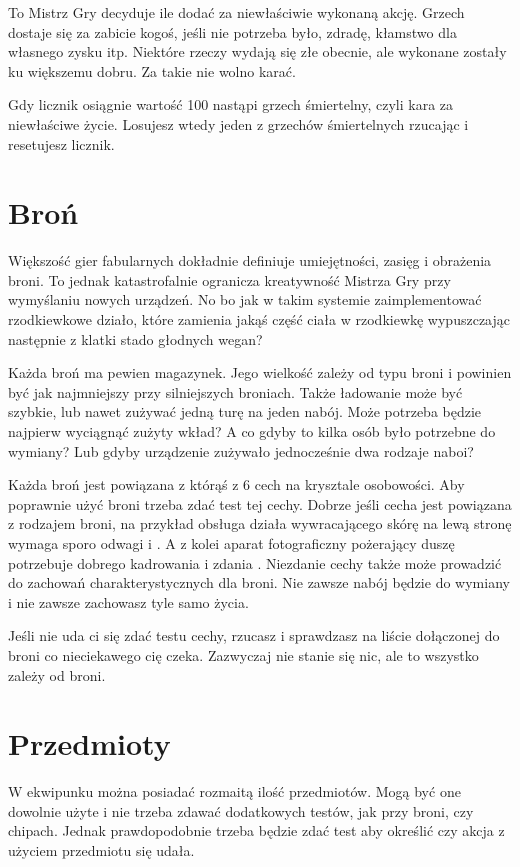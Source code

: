 To Mistrz Gry decyduje ile \abgrz{} dodać za niewłaściwie wykonaną akcję.
Grzech dostaje się za zabicie kogoś, jeśli nie potrzeba było, zdradę, kłamstwo dla własnego zysku itp.
Niektóre rzeczy wydają się złe obecnie, ale wykonane zostały ku większemu dobru. Za takie nie wolno karać.

Gdy licznik \abgrz{} osiągnie wartość 100 nastąpi grzech śmiertelny, czyli kara za niewłaściwe życie.
Losujesz wtedy jeden z grzechów śmiertelnych rzucając \dxx{} i resetujesz licznik.

\section{Broń}
Większość gier fabularnych dokładnie definiuje umiejętności, zasięg i obrażenia broni.
To jednak katastrofalnie ogranicza kreatywność Mistrza Gry przy wymyślaniu nowych urządzeń.
No bo jak w takim systemie zaimplementować rzodkiewkowe działo, które zamienia jakąś część ciała w rzodkiewkę wypuszczając następnie z klatki stado głodnych wegan?

Każda broń ma pewien magazynek.
Jego wielkość zależy od typu broni i powinien być jak najmniejszy przy silniejszych broniach.
Także ładowanie może być szybkie, lub nawet zużywać jedną turę na jeden nabój.
Może potrzeba będzie najpierw wyciągnąć zużyty wkład?
A co gdyby to kilka osób było potrzebne do wymiany?
Lub gdyby urządzenie zużywało jednocześnie dwa rodzaje naboi?

Każda broń jest powiązana z którąś z 6 cech na krysztale osobowości.
Aby poprawnie użyć broni trzeba zdać test tej cechy.
Dobrze jeśli cecha jest powiązana z rodzajem broni, na przykład obsługa działa wywracającego skórę na lewą stronę wymaga sporo odwagi i \abh{}.
A z kolei aparat fotograficzny pożerający duszę potrzebuje dobrego kadrowania i zdania \abp{}.
Niezdanie cechy także może prowadzić do zachowań charakterystycznych dla broni.
Nie zawsze nabój będzie do wymiany i nie zawsze zachowasz tyle samo życia.

Jeśli nie uda ci się zdać testu cechy, rzucasz \dxx{} i sprawdzasz na liście dołączonej do broni co nieciekawego cię czeka.
Zazwyczaj nie stanie się nic, ale to wszystko zależy od broni.

\section{Przedmioty}
W ekwipunku można posiadać rozmaitą ilość przedmiotów.
Mogą być one dowolnie użyte i nie trzeba zdawać dodatkowych testów, jak przy broni, czy chipach.
Jednak prawdopodobnie trzeba będzie zdać test aby określić czy akcja z użyciem przedmiotu się udała.

